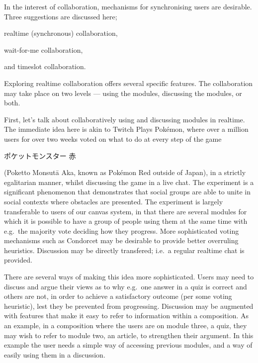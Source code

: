 \documentclass{article}
\begin{document}
\begin{multicols}{2}
In the interest of collaboration, mechanisms for synchronising users are 
desirable. Three suggestions are discussed here;
\begin{itemize*}
  \item realtime (synchronous) collaboration,
  \item wait-for-me collaboration,
  \item and timeslot collaboration.
\end{itemize*}

Exploring realtime collaboration offers several specific features. The 
collaboration may take place on two levels --- using the modules, discussing 
the modules, or both.

First, let's talk about collaboratively using and discussing modules in 
realtime. The immediate idea here is akin to Twitch Plays Pokémon, where over 
a million users for over two weeks voted on what to do at every step of the 
game \begin{CJK}{UTF8}{min}ポケットモンスター 赤\end{CJK} (Poketto Monsut\={a} 
Aka, known as Pokémon Red outside of Japan), in a strictly egalitarian manner, 
whilst discussing the game in a live chat\cite{tpp}. The experiment is a 
significant phenomenon that demonstrates that social groups are able to unite 
in social contexts where obstacles are presented\cite{margeltwitch}. The 
experiment is largely transferable to users of our canvas system, in that 
there are several modules for which it is possible to have a group of people 
using them at the same time with e.g.\ the majority vote deciding how they 
progress. More sophisticated voting mechanisms such as Condorcet may be 
desirable to provide better overruling heuristics. Discussion may be directly 
transfered; i.e.\ a regular realtime chat is provided.

There are several ways of making this idea more sophisticated. Users may need 
to discuss and argue their views as to why e.g.\ one answer in a quiz is 
correct and others are not, in order to achieve a satisfactory outcome (per 
some voting heuristic), lest they be prevented from progressing. Discussion 
may be augmented with features that make it easy to refer to information 
within a composition. As an example, in a composition where the users are on 
module three, a quiz, they may wish to refer to module two, an article, to 
strengthen their argument. In this example the user needs a simple way of 
accessing previous modules, and a way of easily using them in a discussion.


\end{multicols}
\end{document}
